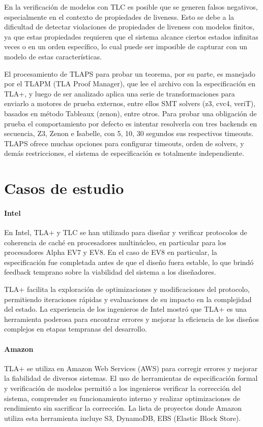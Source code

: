 \documentclass[runningheads]{llncs}
\begin{document}
En la verificación de modelos con TLC es posible que se generen falsos negativos, especialmente en el contexto de propiedades de liveness. Esto se debe a la dificultad de detectar violaciones de propiedades de liveness con modelos finitos, ya que estas propiedades requieren que el sistema alcance ciertos estados infinitas veces o en un orden específico, lo cual puede ser imposible de capturar con un modelo de estas características.

El procesamiento de TLAPS para probar un teorema, por su parte, es manejado por el TLAPM (TLA Proof Manager), que lee el archivo con la especificación en TLA+, y luego de ser analizado aplica una serie de transformaciones para enviarlo a motores de prueba externos, entre ellos SMT solvers (z3, cvc4, veriT), basados en método Tableaux (zenon), entre otros. 
Para probar una obligación de prueba el comportamiento por defecto es intentar resolverla con tres backends en secuencia, Z3, Zenon e Isabelle, con 5, 10, 30 segundos sus respectivos timeouts.
TLAPS ofrece muchas opciones para configurar timeouts, orden de solvers, y demás restricciones, el sistema de especificación es totalmente independiente. %

\section{Casos de estudio}
\paragraph{Intel}
En Intel, TLA+ y TLC se han utilizado para diseñar y verificar protocolos de coherencia de caché en procesadores multinúcleo, en particular para los procesadores Alpha EV7 y EV8. En el caso de EV8 en particular, la especificación fue completada antes de que el diseño fuera estable, lo que brindó feedback temprano sobre la viabilidad del sistema a los diseñadores.

TLA+ facilita la exploración de optimizaciones y modificaciones del protocolo, permitiendo iteraciones rápidas y evaluaciones de su impacto en la complejidad del estado. La experiencia de los ingenieros de Intel mostró que TLA+ es una herramienta poderosa para encontrar errores y mejorar la eficiencia de los diseños complejos en etapas tempranas del desarrollo.\cite{intel}

\paragraph{Amazon}
TLA+ se utiliza en Amazon Web Services (AWS) para corregir errores y mejorar la fiabilidad de diversos sistemas. El uso de herramientas de especificación formal y verificación de modelos permitió a los ingenieros verificar la corrección del sistema, comprender su funcionamiento interno y realizar optimizaciones de rendimiento sin sacrificar la corrección. La lista de proyectos donde Amazon utiliza esta herramienta incluye S3, DynamoDB, EBS (Elastic Block Store).
\end{document}
